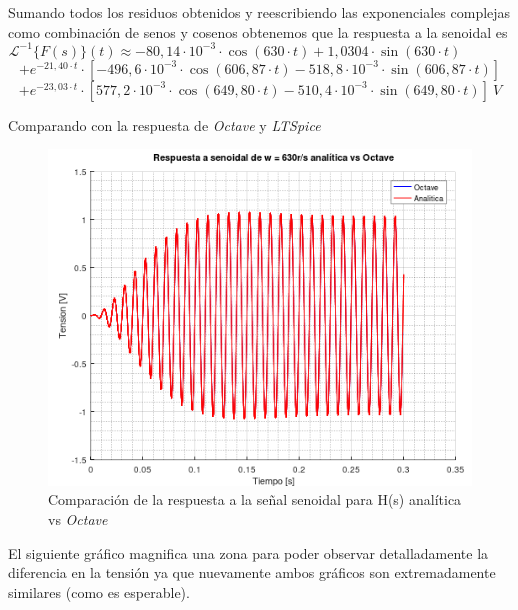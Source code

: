 \documentclass[11pt,a4paper]{report}
\begin{document}
Sumando todos los residuos obtenidos y reescribiendo las exponenciales complejas como combinación de senos y cosenos obtenemos que la respuesta a la senoidal es
\[\mathcal{L}^{-1}\{F(s)\}(t) \approx -80,14 \cdot 10^{-3} \cdot \cos(630 \cdot t) + 1,0304 \cdot \sin(630 \cdot t)\phantom{asdasda}\] 
\[+ e^{-21,40 \cdot t} \cdot [- 496,6 \cdot 10^{-3} \cdot \cos(606,87 \cdot t) - 518,8 \cdot 10^{-3} \cdot \sin(606,87 \cdot t)]\]
\[+ e^{-23,03 \cdot t} \cdot [577,2 \cdot 10^{-3} \cdot \cos(649,80 \cdot t) - 510,4 \cdot 10^{-3} \cdot \sin(649,80 \cdot t)] \ V\]

\bigskip
Comparando con la respuesta de \textit{Octave} y \textit{LTSpice}
\newpage

\begin{figure}[ht!]
\centering
\includegraphics[scale=1]{rtaSenoidalAnaliticavsOctave.png}
\caption{Comparación de la respuesta a la señal senoidal para H(s) analítica vs \textit{Octave}}
\end{figure}

El siguiente gráfico magnifica una zona para poder observar detalladamente la diferencia en la tensión ya que nuevamente ambos gráficos son extremadamente similares (como es esperable).
\end{document}
